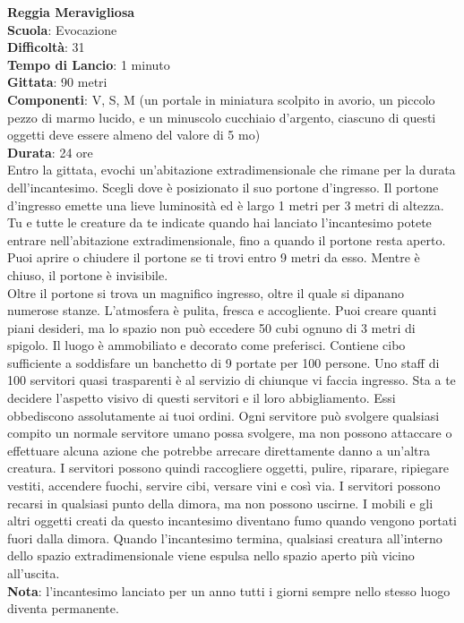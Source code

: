 \begin{multicols}{2}
\medskip\textbf{Reggia Meravigliosa}\\
\textbf{Scuola}: Evocazione\\
\textbf{Difficoltà}: 31\\
\textbf{Tempo di Lancio}: 1 minuto\\
\textbf{Gittata}: 90 metri\\
\textbf{Componenti}: V, S, M (un portale in miniatura scolpito in avorio, un piccolo pezzo di marmo lucido, e un minuscolo cucchiaio d'argento, ciascuno di questi oggetti deve essere almeno del valore di 5 mo)\\
\textbf{Durata}: 24 ore\\
Entro la gittata, evochi un'abitazione extradimensionale che rimane per la durata dell'incantesimo. Scegli dove è posizionato il suo portone d'ingresso. Il portone d'ingresso emette una lieve luminosità ed è largo 1 metri per 3 metri di altezza. Tu e tutte le creature da te indicate quando hai lanciato l'incantesimo potete entrare nell'abitazione extradimensionale, fino a quando il portone resta aperto. Puoi aprire o chiudere il portone se ti trovi entro 9 metri da esso. Mentre è chiuso, il portone è invisibile.\\
Oltre il portone si trova un magnifico ingresso, oltre il quale si dipanano numerose stanze. L'atmosfera è pulita, fresca e accogliente. Puoi creare quanti piani desideri, ma lo spazio non può eccedere 50 cubi ognuno di 3 metri di spigolo. Il luogo è ammobiliato e decorato come preferisci. Contiene cibo sufficiente a soddisfare un banchetto di 9 portate per 100 persone. Uno staff di 100 servitori quasi trasparenti è al servizio di chiunque vi faccia ingresso. Sta a te decidere l'aspetto visivo di questi servitori e il loro abbigliamento. Essi obbediscono assolutamente ai tuoi ordini. Ogni servitore può svolgere qualsiasi compito un normale servitore umano possa svolgere, ma non possono attaccare o effettuare alcuna azione che potrebbe arrecare direttamente danno a un'altra creatura. I servitori possono quindi raccogliere oggetti, pulire, riparare, ripiegare vestiti, accendere fuochi, servire cibi, versare vini e così via. I servitori possono recarsi in qualsiasi punto della dimora, ma non possono uscirne. I mobili e gli altri oggetti creati da questo incantesimo diventano fumo quando vengono portati fuori dalla dimora. Quando l'incantesimo termina, qualsiasi creatura all'interno dello spazio extradimensionale viene espulsa nello spazio aperto più vicino all'uscita.\\
\textbf{Nota}: l'incantesimo lanciato per un anno tutti i giorni sempre nello stesso luogo diventa permanente.


\end{multicols}
